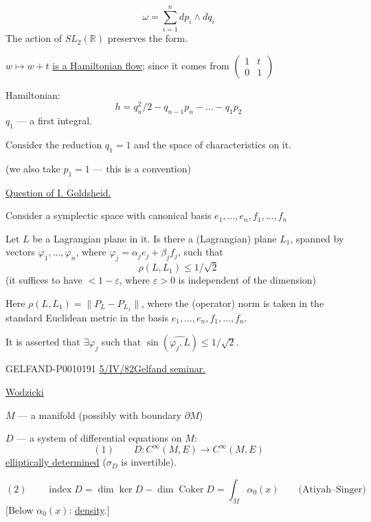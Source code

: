 \[
\omega=\sum_{i=1}^{n}dp_i\wedge dq_i
\]
The action of $SL_2(\mathbb{R})$ preserves the form.

$w\mapsto w+t$ \underline{is a Hamiltonian flow}; since it comes from
$\begin{pmatrix}1&t\\0&1\end{pmatrix}$

Hamiltonian:
\[
h=q_n^2/2-q_{n-1}p_n-\ldots-q_1p_2
\]
$q_1$ --- a first integral.

Consider the reduction $q_1=1$ and the space of characteristics on it.

(we also take $p_1=1$ --- this is a convention)

\underline{Question of I. Goldsheid.}

Consider a symplectic space with canonical basis $e_1,\ldots,e_n,f_1,\ldots,f_n$

Let $L$ be a Lagrangian plane in it.
Is there a (Lagrangian) plane $L_1$, spanned by vectors $\varphi_1,\ldots,\varphi_n$, where
$\varphi_j=\alpha_j e_j+\beta_j f_j$, such that
\[
\rho(L,L_1)\le 1/\sqrt{2}
\]
(it suffices to have $<1-\varepsilon$, where $\varepsilon>0$ is independent of the dimension)

Here $\rho(L,L_1)=\|P_L-P_{L_1}\|$, where the (operator) norm is taken in the standard Euclidean metric in the basis
$e_1,\ldots,e_n,f_1,\ldots,f_n$.

It is asserted that $\exists\varphi_j$ such that $\sin(\widehat{\varphi_j,L})\le 1/\sqrt{2}$.


\begin{GelfandAdjacentEvidence}{GELFAND-P001019}{1}
\underline{\underline{5/IV/82}}\qquad\underline{Gelfand seminar.}

\underline{\underline{Wodzicki}}

$M$ --- a manifold (possibly with boundary $\partial M$)

$D$ --- a system of differential equations on $M$:
\[
(1)\qquad D:C^\infty(M,E)\longrightarrow C^\infty(M,E)
\]
\underline{elliptically determined} ($\sigma_D$ is invertible).

\end{GelfandAdjacentEvidence}

\[
(2)\qquad \operatorname{index}D=\dim\ker D-\dim\operatorname{Coker}D
=\int_M\alpha_0(x)\qquad\text{(Atiyah--Singer)}
\]
[Below $\alpha_0(x)$: \underline{density}.]

